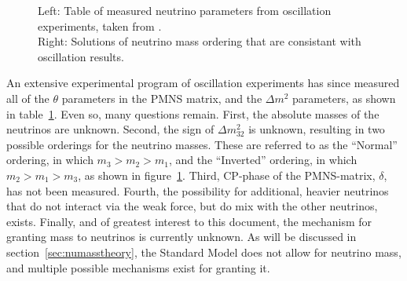 \documentclass[/main.tex]{subfiles}
\begin{document}
\begin{figure}[t]
  \centering
  \caption[Neutrino Oscillation Parameters and Mass Ordering]{\label{fig:massordering}
    Left: Table of measured neutrino parameters from oscillation experiments, taken from \cite{PDG2018}.\\
    Right: Solutions of neutrino mass ordering that are consistant with oscillation results.
  }
\end{figure}
An extensive experimental program of oscillation experiments has since measured all of the $\theta$ parameters in the PMNS matrix, and the $\Delta m^2$ parameters, as shown in table~\ref{fig:massordering}.
Even so, many questions remain.
First, the absolute masses of the neutrinos are unknown.
Second, the sign of $\Delta m^2_{32}$ is unknown, resulting in two possible orderings for the neutrino masses.
These are referred to as the ``Normal'' ordering, in which $m_3>m_2>m_1$, and the ``Inverted'' ordering, in which $m_2>m_1>m_3$, as shown in figure~\ref{fig:massordering}.
Third, CP-phase of the PMNS-matrix, $\delta$, has not been measured.
Fourth, the possibility for additional, heavier neutrinos that do not interact via the weak force, but do mix with the other neutrinos, exists.
Finally, and of greatest interest to this document, the mechanism for granting mass to neutrinos is currently unknown.
As will be discussed in section~\ref{sec:numasstheory}, the Standard Model does not allow for neutrino mass, and multiple possible mechanisms exist for granting it.
\end{document}

